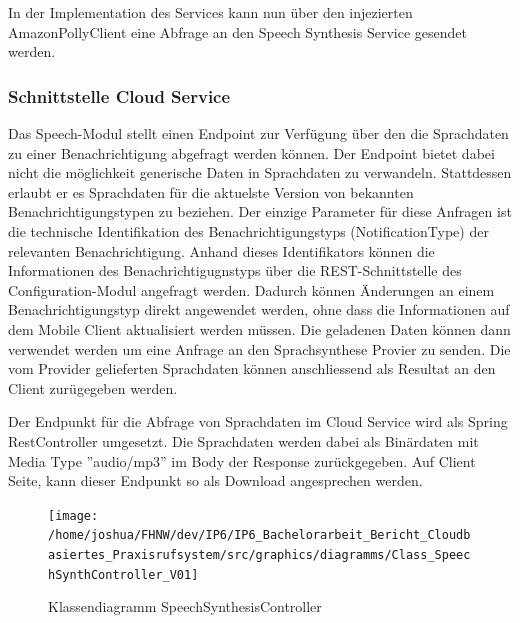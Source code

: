 %

In der Implementation des Services kann nun über den injezierten AmazonPollyClient eine Abfrage an den Speech Synthesis Service gesendet werden.

\clearpage
\subsubsection{Schnittstelle Cloud Service}

Das Speech-Modul stellt einen Endpoint zur Verfügung über den die Sprachdaten zu einer Benachrichtigung abgefragt werden können.
Der Endpoint bietet dabei nicht die möglichkeit generische Daten in Sprachdaten zu verwandeln.
Stattdessen erlaubt er es Sprachdaten für die aktuelste Version von bekannten Benachrichtigungstypen zu beziehen.
Der einzige Parameter für diese Anfragen ist die technische Identifikation des Benachrichtigungstyps (NotificationType) der relevanten Benachrichtigung.
Anhand dieses Identifikators können die Informationen des Benachrichtigugnstyps über die REST-Schnittstelle des Configuration-Modul angefragt werden.
Dadurch können Änderungen an einem Benachrichtigungstyp direkt angewendet werden, ohne dass die Informationen auf dem Mobile Client aktualisiert werden müssen.
Die geladenen Daten können dann verwendet werden um eine Anfrage an den Sprachsynthese Provier zu senden.
Die vom Provider gelieferten Sprachdaten können anschliessend als Resultat an den Client zurügegeben werden.

Der Endpunkt für die Abfrage von Sprachdaten im Cloud Service wird als Spring RestController umgesetzt.
Die Sprachdaten werden dabei als Binärdaten mit Media Type ''audio/mp3'' im Body der Response zurückgegeben.
Auf Client Seite, kann dieser Endpunkt so als Download angesprechen werden.

\begin{figure}[h]
    \centering
    \begin{minipage}[b]{0.8\textwidth}
        \texttt{[image: /home/joshua/FHNW/dev/IP6/IP6\_Bachelorarbeit\_Bericht\_Cloudbasiertes\_Praxisrufsystem/src/graphics/diagramms/Class\_SpeechSynthController\_V01]}
        \caption{Klassendiagramm SpeechSynthesisController}
    \end{minipage}
\end{figure}


%

